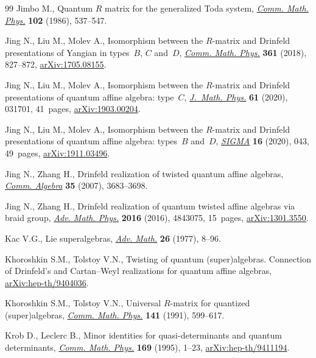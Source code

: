 \documentclass[10pt,a4paper]{amsart}
\numberwithin{equation}{section}
\begin{document}
\begin{thebibliography}{99}
Jimbo M., Quantum {$R$} matrix for the generalized {T}oda system, \href{https://doi.org/10.1007/BF01221646}{\textit{Comm.
 Math. Phys.}} \textbf{102} (1986), 537--547.

Jing N., Liu M., Molev A., Isomorphism between the $R$-matrix and Drinfeld
 presentations of {Y}angian in types~$B$, $C$ and~$D$, \href{https://doi.org/10.1007/s00220-018-3185-x}{\textit{Comm. Math.
 Phys.}} \textbf{361} (2018), 827--872, \href{https://arxiv.org/abs/1705.08155}{arXiv:1705.08155}.

Jing N., Liu M., Molev A., Isomorphism between the {$R$}-matrix and {D}rinfeld
 presentations of quantum affine algebra: type~{$C$}, \href{https://doi.org/10.1063/1.5133854}{\textit{J.~Math. Phys.}}
 \textbf{61} (2020), 031701, 41~pages, \href{https://arxiv.org/abs/1903.00204}{arXiv:1903.00204}.

Jing N., Liu M., Molev A., Isomorphism between the $R$-matrix and {D}rinfeld
 presentations of quantum affine algebra: types~$B$ and~$D$, \href{https://doi.org/10.3842/SIGMA.2020.043}{\textit{SIGMA}}
 \textbf{16} (2020), 043, 49~pages, \href{https://arxiv.org/abs/1911.03496}{arXiv:1911.03496}.

Jing N., Zhang H., Drinfeld realization of twisted quantum affine algebras,
 \href{https://doi.org/10.1080/00927870701404713}{\textit{Comm. Algebra}} \textbf{35} (2007), 3683--3698.

Jing N., Zhang H., Drinfeld realization of quantum twisted affine algebras via
 braid group, \href{https://doi.org/10.1155/2016/4843075}{\textit{Adv. Math. Phys.}} \textbf{2016} (2016), 4843075,
 15~pages, \href{https://arxiv.org/abs/1301.3550}{arXiv:1301.3550}.

Kac V.G., Lie superalgebras, \href{https://doi.org/10.1016/0001-8708(77)90017-2}{\textit{Adv. Math.}} \textbf{26} (1977), 8--96.

Khoroshkin S.M., Tolstoy V.N., Twisting of quantum (super)algebras.
 {C}onnection of {D}rinfeld's and {C}artan--{W}eyl realizations for quantum
 affine algebras, \href{https://arxiv.org/abs/hep-th/9404036}{arXiv:hep-th/9404036}.

Khoroshkin S.M., Tolstoy V.N., Universal {$R$}-matrix for quantized
 (super)algebras, \href{https://doi.org/10.1007/BF02102819}{\textit{Comm. Math. Phys.}} \textbf{141} (1991), 599--617.

Krob D., Leclerc B., Minor identities for quasi-determinants and quantum
 determinants, \href{https://doi.org/10.1007/BF02101594}{\textit{Comm. Math. Phys.}} \textbf{169} (1995), 1--23,
 \href{https://arxiv.org/abs/hep-th/9411194}{arXiv:hep-th/9411194}.


\end{thebibliography}
\end{document}
